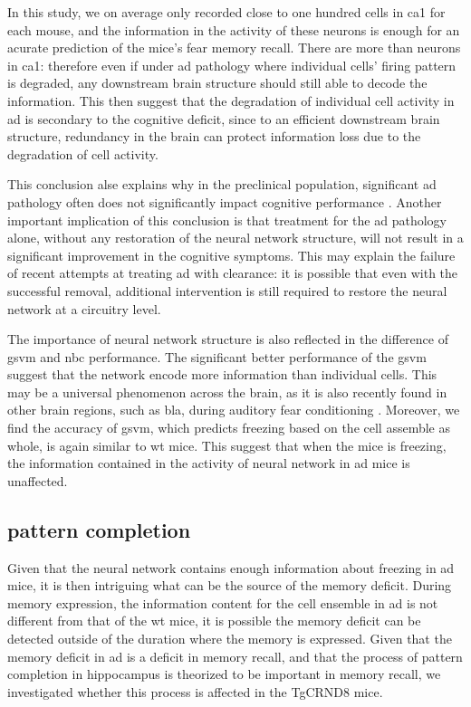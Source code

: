 In this study, we on average only recorded close to one hundred cells in \gls{ca1} for each mouse, and the information in the activity of these neurons is enough for an acurate prediction of the mice's fear memory recall. There are more than  neurons in \gls{ca1}: therefore even if under \gls{ad} pathology where individual cells' firing pattern is degraded, any downstream brain structure should still able to decode the information. This then suggest that the degradation of individual cell activity in \gls{ad} is secondary to the cognitive deficit, since to an efficient downstream brain structure, redundancy in the brain can protect information loss due to the degradation of cell activity. 

This conclusion alse explains why in the preclinical population, significant \gls{ad} pathology often does not significantly impact cognitive performance . Another important implication of this conclusion is that treatment for the \gls{ad} pathology alone, without any restoration of the neural network structure, will not result in a significant improvement in the cognitive symptoms. This may explain the failure of recent attempts at treating \gls{ad} with \abeta{} clearance: it is possible that even with the successful \abeta{} removal, additional intervention is still required to restore the neural network at a circuitry level.

The importance of neural network structure is also reflected in the difference of \gls{gsvm} and \gls{nbc} performance. The significant better performance of the \gls{gsvm} suggest that the network encode more information than individual cells. This may be a universal phenomenon across the brain, as it is also recently found in other brain regions, such as \gls{bla}, during auditory fear conditioning \citep{grewe17}. Moreover, we find the accuracy of \gls{gsvm}, which predicts freezing based on the cell assemble as whole, is again similar to \gls{wt} mice. This suggest that when the mice is freezing, the information contained in the activity of neural network in \gls{ad} mice is unaffected. 

\subsection{pattern completion}

Given that the neural network contains enough information about freezing in \gls{ad} mice, it is then intriguing what can be the source of the memory deficit. During memory expression, the information content for the cell ensemble in \gls{ad} is not different from that of the \gls{wt} mice, it is possible the memory deficit can be detected outside of the duration where the memory is expressed. Given that the memory deficit in \gls{ad} is a deficit in memory recall, and that the process of pattern completion in hippocampus is theorized to be important in memory recall, we investigated whether this process is affected in the TgCRND8 mice.

